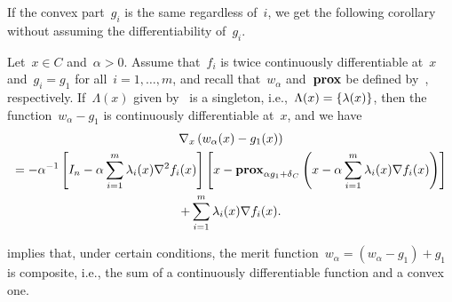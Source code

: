\documentclass[../../main]{subfiles}
\begin{document}
                           If the convex part~$g_i$ is the same regardless of~$i$, we get the following corollary without assuming the differentiability of~$g_i$.
                           \begin{corollary} 
                               Let~$x \in C$ and~$\alpha > 0$.
                               Assume that~$f_i$ is twice continuously differentiable at~$x$ and~$g_i = g_1$ for all~$i = 1, \dots, m$, and recall that~$w_\alpha$ and~$\prox$ be defined by~, respectively.
                               If~$\Lambda(x)$ given by~ is a singleton, i.e.,~$\Lambda(x) = \set*{\lambda(x)}$, then the function~$w_\alpha - g_1$ is continuously differentiable at~$x$, and we have
                               \begin{multline}
                                   \nabla_x \left( w_\alpha(x) - g_1(x) \right) \\
                                   = - \alpha^{-1} \left[ I_n - \alpha \sum_{i = 1}^{m} \lambda_i(x) \nabla^2 f_i(x) \right] \left[x - \prox_{\alpha g_1 + \indicator_C} \left( x - \alpha \sum_{i = 1}^{m} \lambda_i(x) \nabla f_i(x) \right) \right] \\
                                   + \sum_{i = 1}^{m} \lambda_i(x) \nabla f_i(x)
                               .\end{multline}
                           \end{corollary}
                            implies that, under certain conditions, the merit function~$w_\alpha = (w_\alpha - g_1) + g_1$ is composite, i.e., the sum of a continuously differentiable function and a convex one.
\end{document}
